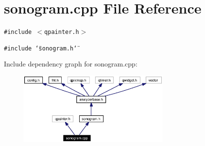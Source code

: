 \section{sonogram.cpp File Reference}
\label{sonogram_8cpp}


{\tt \#include $<$qpainter.h$>$}\par
{\tt \#include \char`\"{}sonogram.h\char`\"{}}\par


Include dependency graph for sonogram.cpp:\begin{figure}[H]
\begin{center}
\leavevmode
\includegraphics[width=215pt]{sonogram_8cpp__incl}
\end{center}
\end{figure}
